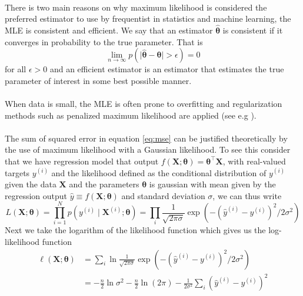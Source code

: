 \\
There is two main reasons on why maximum likelihood is considered the preferred estimator to use by frequentist in statistics and machine learning, the MLE is consistent and efficient. We say that an estimator $\hat{\boldsymbol{\theta}}$ is consistent if it converges in probability to the true parameter. That is
\begin{equation*}
    \lim_{n \rightarrow \infty} p\left(\mid\hat{\boldsymbol{\theta}}-\boldsymbol{\theta}\mid > \epsilon\right)=0
\end{equation*}
for all $\epsilon>0$ and an efficient estimator is an estimator that estimates the true parameter of interest in some best possible manner. \\
\\
When data is small, the MLE is often prone to overfitting and regularization methods such as penalized maximum likelihood are applied (see e.g \cite{hastie01statisticallearning}).\\
\\
The sum of squared error in equation \ref{eq:mse} can be justified theoretically by the use of maximum likelihood with a Gaussian likelihood.
To see this consider that we have regression model that output $f(\mathbf{X};\boldsymbol{\theta})=\boldsymbol{\theta}^\top\mathbf{X}$, with real-valued targets $y^{(i)}$ and the likelihood defined as the conditional distribution of $y^{(i)}$ given the data $\mathbf{X}$ and the parameters $\boldsymbol{\theta}$ is gaussian with mean given by the regression output $\hat{y}\equiv f(\mathbf{X};\boldsymbol{\theta})$ and standard deviation $\sigma$, we can thus write
\begin{equation*}
    L(\mathbf{X};\boldsymbol{\theta})=\prod_{i=1}^{N} p\left(y^{(i)} \mid \mathbf{X}^{(i)} ; \boldsymbol{\theta}\right)=\prod_i\frac{1}{\sqrt{2\pi\sigma}}\exp\left(-(\hat{y}^{(i)}-y^{(i)})^2/2\sigma^2\right)
\end{equation*}
Next we take the
logarithm of the likelihood function which gives us the log-likelihood function
\begin{equation*}
\begin{split}
        \ell(\mathbf{X};\boldsymbol{\theta})&=\sum_i\ln\frac{1}{\sqrt{2\pi\sigma}}\exp\left(-(\hat{y}^{(i)}-y^{(i)})^2/2\sigma^2\right)\\
        &=-\frac{n}{2} \ln \sigma^{2}-\frac{n}{2} \ln (2 \pi)-\frac{1}{2 \sigma^{2}} \sum_{i}\left(\hat{y}^{(i)}-y^{(i)}\right)^{2}
\end{split}
\end{equation*}
